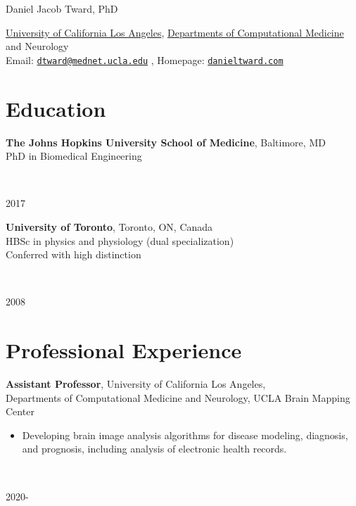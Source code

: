 \documentclass[letterpaper,11pt]{article}
\def\name{Daniel Jacob Tward, PhD}
\begin{document}
{\huge \name}




  \href{https://www.ucla.edu//}{University of California Los Angeles}, 
  \href{https://compmed.ucla.edu/}{Departments of Computational Medicine} and Neurology\\
Email: \href{mailto:dtward@mednet.ucla.edu}{\tt dtward@mednet.ucla.edu} , Homepage: \href{http://danieltward.com}{\tt danieltward.com}


\newcommand{\dancol}[2]{%
\begin{minipage}{5.9in}%
#1 %
\end{minipage}~%
\begin{minipage}{0.6in}%
\hfill%
#2%
\end{minipage}%
\vspace{1em}%
}


\vspace{-1em}
\section*{Education}
\vspace{-0.75em}

\dancol{\textbf{The Johns Hopkins University School of Medicine}, Baltimore, MD\\
PhD in Biomedical Engineering}{2017}

\dancol{\textbf{University of Toronto}, Toronto, ON, Canada\\HBSc in physics and physiology (dual specialization)\\Conferred with high distinction}{2008}


\vspace{-1em}
\section*{Professional Experience}
\vspace{-0.75em}

\dancol{\textbf{Assistant Professor},
University of California Los Angeles, \\Departments of Computational Medicine and Neurology, UCLA Brain Mapping Center\\
\vspace{-0.3in}
\begin{itemize}[noitemsep]
\item 

Developing brain image analysis algorithms for disease modeling, diagnosis, and prognosis, including analysis of electronic health records.

\end{itemize}
}{2020-\phantom{20}}
\end{document}

